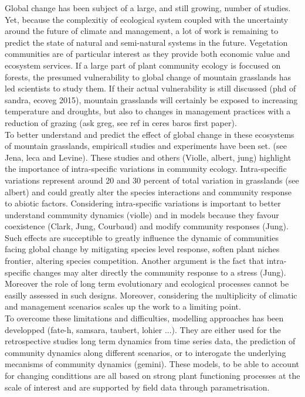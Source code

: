 \documentclass[review]{elsarticle}
\begin{document}
Global change has been subject of a large, and still growing, number of studies. Yet, because the complexitiy of ecological system coupled with the uncertainty around the future of climate and management, a lot of work is remaining to predict the state of natural and semi-natural systems in the future. Vegetation communities are of particular interest as they provide both economic value and ecosystem services. If a large part of plant community ecology is foccused on forests, the presumed vulnerability to global change of mountain grasslands has led scientists to study them. If their actual vulnerability is still discussed (phd of sandra, ecoveg 2015), mountain grasslands will certainly be exposed to increasing temperature and droughts, but also to changes in management practices with a reduction of grazing (ask greg, see ref in ceres baros first paper).\\
To better understand and predict the effect of global change in these ecosystems of mountain grasslands, empiricall studies and experiments have been set. (see Jena, leca and Levine). These studies and others (Violle, albert, jung) highlight the importance of intra-specific variations in community ecology. Intra-specific variations represent around 20 and 30 percent of total variation in grasslands (see albert) and could greatly alter the species interactions and community response to abiotic factors. Considering intra-specific variations is important to better understand community dynamics (violle) and in models because they favour coexistence (Clark, Jung, Courbaud) and modify community responses (Jung). Such effects are succeptible to greatly influence the dynamic of communities facing global change by mitigating species level response, soften plant niches frontier, altering species competition. Another argument is the fact that intra-specific changes may alter directly the community response to a stress (Jung).\\

 Moreover the role of long term evolutionary and ecological processes cannot be easilly assessed in such designs. Moreover, considering the multiplicity of climatic and management scenarios scales up the work to a limiting point.\\



To overcome these limitations and difficulties, modelling approaches has been developped (fate-h, samsara, taubert, lohier ...). They are either used for the retrospective studies long term dynamics from time series data, the prediction of community dynamics along different scenarios, or to interogate the underlying mecanisms of community dynamics (gemini). These models, to be able to account for changing condittions are all based on strong plant functioning processes at the scale of interest and are supported by field data through parametrisation.\\
\end{document}
